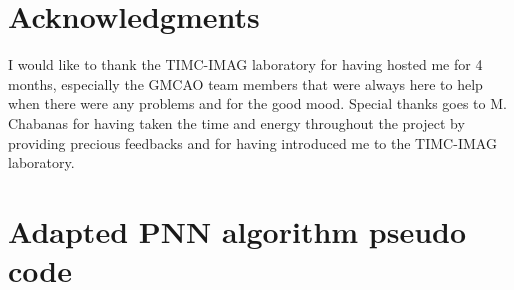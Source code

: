 \documentclass[12pt,journal,compsoc]{IEEEtran}
\begin{document}
\section*{Acknowledgments}
I would like to thank the TIMC-IMAG laboratory for having hosted me for 4 months, especially the GMCAO team members that were always here to help when there were any problems and for the good mood. Special thanks goes to M. Chabanas for having taken the time and energy throughout the project by providing precious feedbacks and for having introduced me to the TIMC-IMAG laboratory.

\appendices

\section{Adapted PNN algorithm pseudo code}
\end{document}
